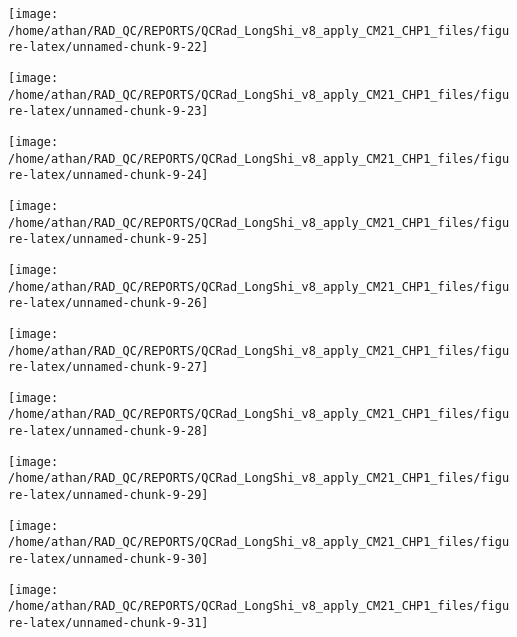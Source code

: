 \documentclass[
  10pt,
  a4paper,oneside]{article}
\begin{document}
\begin{center}\texttt{[image: /home/athan/RAD\_QC/REPORTS/QCRad\_LongShi\_v8\_apply\_CM21\_CHP1\_files/figure-latex/unnamed-chunk-9-22]} \end{center}

\begin{center}\texttt{[image: /home/athan/RAD\_QC/REPORTS/QCRad\_LongShi\_v8\_apply\_CM21\_CHP1\_files/figure-latex/unnamed-chunk-9-23]} \end{center}

\begin{center}\texttt{[image: /home/athan/RAD\_QC/REPORTS/QCRad\_LongShi\_v8\_apply\_CM21\_CHP1\_files/figure-latex/unnamed-chunk-9-24]} \end{center}

\begin{center}\texttt{[image: /home/athan/RAD\_QC/REPORTS/QCRad\_LongShi\_v8\_apply\_CM21\_CHP1\_files/figure-latex/unnamed-chunk-9-25]} \end{center}

\begin{center}\texttt{[image: /home/athan/RAD\_QC/REPORTS/QCRad\_LongShi\_v8\_apply\_CM21\_CHP1\_files/figure-latex/unnamed-chunk-9-26]} \end{center}

\begin{center}\texttt{[image: /home/athan/RAD\_QC/REPORTS/QCRad\_LongShi\_v8\_apply\_CM21\_CHP1\_files/figure-latex/unnamed-chunk-9-27]} \end{center}

\begin{center}\texttt{[image: /home/athan/RAD\_QC/REPORTS/QCRad\_LongShi\_v8\_apply\_CM21\_CHP1\_files/figure-latex/unnamed-chunk-9-28]} \end{center}

\begin{center}\texttt{[image: /home/athan/RAD\_QC/REPORTS/QCRad\_LongShi\_v8\_apply\_CM21\_CHP1\_files/figure-latex/unnamed-chunk-9-29]} \end{center}

\begin{center}\texttt{[image: /home/athan/RAD\_QC/REPORTS/QCRad\_LongShi\_v8\_apply\_CM21\_CHP1\_files/figure-latex/unnamed-chunk-9-30]} \end{center}

\begin{center}\texttt{[image: /home/athan/RAD\_QC/REPORTS/QCRad\_LongShi\_v8\_apply\_CM21\_CHP1\_files/figure-latex/unnamed-chunk-9-31]} \end{center}
\end{document}

